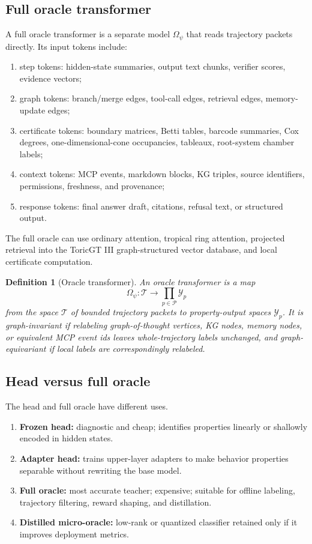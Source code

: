 \documentclass[11pt]{article}
\newtheorem{definition}[theorem]{Definition}
\newcommand{\calP}{\mathcal{P}}
\newcommand{\calT}{\mathcal{T}}
\newcommand{\calY}{\mathcal{Y}}
\numberwithin{equation}{section}
\begin{document}
\subsection{Full oracle transformer}
A full oracle transformer is a separate model $\Omega_\psi$ that reads trajectory packets directly. Its input tokens include:
\begin{enumerate}
\item step tokens: hidden-state summaries, output text chunks, verifier scores, evidence vectors;
\item graph tokens: branch/merge edges, tool-call edges, retrieval edges, memory-update edges;
\item certificate tokens: boundary matrices, Betti tables, barcode summaries, Cox degrees, one-dimensional-cone occupancies, tableaux, root-system chamber labels;
\item context tokens: MCP events, markdown blocks, KG triples, source identifiers, permissions, freshness, and provenance;
\item response tokens: final answer draft, citations, refusal text, or structured output.
\end{enumerate}
The full oracle can use ordinary attention, tropical ring attention, projected retrieval into the ToricGT III graph-structured vector database, and local certificate computation.

\begin{definition}[Oracle transformer]
An oracle transformer is a map
\begin{equation}
\Omega_\psi:\calT\to \prod_{p\in\calP}\calY_p
\end{equation}
from the space $\calT$ of bounded trajectory packets to property-output spaces $\calY_p$. It is graph-invariant if relabeling graph-of-thought vertices, KG nodes, memory nodes, or equivalent MCP event ids leaves whole-trajectory labels unchanged, and graph-equivariant if local labels are correspondingly relabeled.
\end{definition}

\subsection{Head versus full oracle}
The head and full oracle have different uses.
\begin{enumerate}
\item \textbf{Frozen head:} diagnostic and cheap; identifies properties linearly or shallowly encoded in hidden states.
\item \textbf{Adapter head:} trains upper-layer adapters to make behavior properties separable without rewriting the base model.
\item \textbf{Full oracle:} most accurate teacher; expensive; suitable for offline labeling, trajectory filtering, reward shaping, and distillation.
\item \textbf{Distilled micro-oracle:} low-rank or quantized classifier retained only if it improves deployment metrics.
\end{enumerate}
\end{document}
